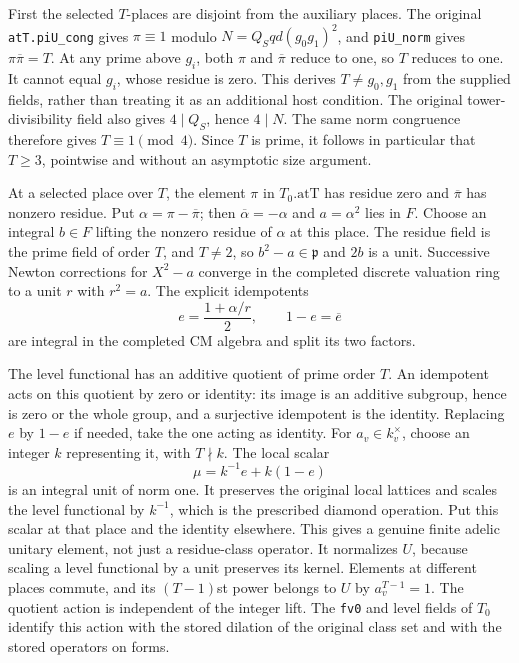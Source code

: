 First the selected $T$-places are disjoint from the auxiliary
places.  The original \texttt{atT.piU\_cong} gives
$\pi\equiv1$ modulo
$N=Q_Sqd(g_0g_1)^2$, and \texttt{piU\_norm} gives
$\pi\overline\pi=T$.  At any prime above $g_i$, both
$\pi$ and $\overline\pi$ reduce to one, so $T$ reduces
to one.  It cannot equal $g_i$, whose residue is zero.
This derives $T\ne g_0,g_1$ from the supplied fields,
rather than treating it as an additional host condition.
The original tower-divisibility field also gives
$4\mid Q_S$, hence $4\mid N$.  The same norm congruence
therefore gives $T\equiv1\pmod4$.  Since $T$ is prime,
it follows in particular that $T\ge3$, pointwise and
without an asymptotic size argument.

At a selected place over $T$, the element $\pi$ in
$T_0.\mathrm{atT}$ has residue zero and $\overline\pi$ has
nonzero residue.  Put $\alpha=\pi-\overline\pi$; then
$\overline\alpha=-\alpha$ and $a=\alpha^2$ lies in $F$.
Choose an integral $b\in F$ lifting the nonzero residue of
$\alpha$ at this place.  The residue field is the prime field
of order $T$, and $T\ne2$, so
$b^2-a\in\mathfrak p$ and $2b$ is a unit.  Successive Newton
corrections for $X^2-a$ converge in the completed discrete
valuation ring to a unit $r$ with $r^2=a$.  The explicit
idempotents
\[
            e=\frac{1+\alpha/r}{2},\qquad
            1-e=\overline e
                                                                  \tag{RSL.12}
\]
are integral in the completed CM algebra and split its two
factors.

The level functional has an additive quotient of prime order
$T$.  An idempotent acts on this quotient by zero or identity:
its image is an additive subgroup, hence is zero or the whole
group, and a surjective idempotent is the identity.  Replacing
$e$ by $1-e$ if needed, take the one acting as identity.  For
$a_v\in k_v^\times$, choose an integer $k$ representing it,
with $T\nmid k$.  The local scalar
\[
                   \mu=k^{-1}e+k(1-e)
                                                                  \tag{RSL.13}
\]
is an integral unit of norm one.  It preserves the original
local lattices and scales the level functional by $k^{-1}$,
which is the prescribed diamond operation.  Put this scalar
at that place and the identity elsewhere.  This gives a
genuine finite adelic unitary element, not just a residue-class
operator.  It normalizes $U$, because scaling a level functional
by a unit preserves its kernel.  Elements at different places
commute, and its $(T-1)$st power belongs to $U$ by
$a_v^{T-1}=1$.  The quotient action is independent of the
integer lift.  The \texttt{fv0} and level fields of $T_0$
identify this action with the stored dilation of the original
class set and with the stored operators on forms.

